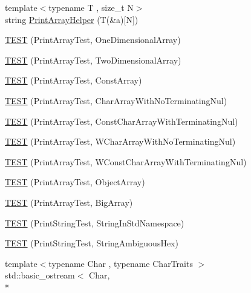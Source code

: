 \begin{DoxyCompactItemize}
\item 
{\footnotesize template$<$typename T , size\-\_\-t N$>$ }\\string \hyperlink{namespacetesting_1_1gtest__printers__test_a10300ded1e327c98c6a36beb7ad49e58}{Print\-Array\-Helper} (T(\&a)\mbox{[}N\mbox{]})
\item 
\hyperlink{namespacetesting_1_1gtest__printers__test_a3845c4717b03cb5ad309c7d9a37acb0a}{T\-E\-S\-T} (Print\-Array\-Test, One\-Dimensional\-Array)
\item 
\hyperlink{namespacetesting_1_1gtest__printers__test_ac366b9ec749b2499d21583d3b8f86273}{T\-E\-S\-T} (Print\-Array\-Test, Two\-Dimensional\-Array)
\item 
\hyperlink{namespacetesting_1_1gtest__printers__test_a8b5638f178c12f58707ca0f02a3b4d41}{T\-E\-S\-T} (Print\-Array\-Test, Const\-Array)
\item 
\hyperlink{namespacetesting_1_1gtest__printers__test_a3bae023a42049745b49fa1f2db9a0cb2}{T\-E\-S\-T} (Print\-Array\-Test, Char\-Array\-With\-No\-Terminating\-Nul)
\item 
\hyperlink{namespacetesting_1_1gtest__printers__test_ab51b9ecaca7d635326101b23d5e8afd2}{T\-E\-S\-T} (Print\-Array\-Test, Const\-Char\-Array\-With\-Terminating\-Nul)
\item 
\hyperlink{namespacetesting_1_1gtest__printers__test_ac19ec2732031bfe83b30ea9f00259ef3}{T\-E\-S\-T} (Print\-Array\-Test, W\-Char\-Array\-With\-No\-Terminating\-Nul)
\item 
\hyperlink{namespacetesting_1_1gtest__printers__test_a6a7cbcdbe748a1d4e90658f48f36c9da}{T\-E\-S\-T} (Print\-Array\-Test, W\-Const\-Char\-Array\-With\-Terminating\-Nul)
\item 
\hyperlink{namespacetesting_1_1gtest__printers__test_af91d8ad9d6c7547913fe05c7acc44114}{T\-E\-S\-T} (Print\-Array\-Test, Object\-Array)
\item 
\hyperlink{namespacetesting_1_1gtest__printers__test_a596493b56489aa1571fa26d1402e7116}{T\-E\-S\-T} (Print\-Array\-Test, Big\-Array)
\item 
\hyperlink{namespacetesting_1_1gtest__printers__test_abbd355e76033f0defd76c37523ad0f60}{T\-E\-S\-T} (Print\-String\-Test, String\-In\-Std\-Namespace)
\item 
\hyperlink{namespacetesting_1_1gtest__printers__test_ac20ee165500471e363011c3f664d2fb8}{T\-E\-S\-T} (Print\-String\-Test, String\-Ambiguous\-Hex)
\item 
{\footnotesize template$<$typename Char , typename Char\-Traits $>$ }\\std\-::basic\-\_\-ostream$<$ Char, \\*

\end{DoxyCompactItemize}
